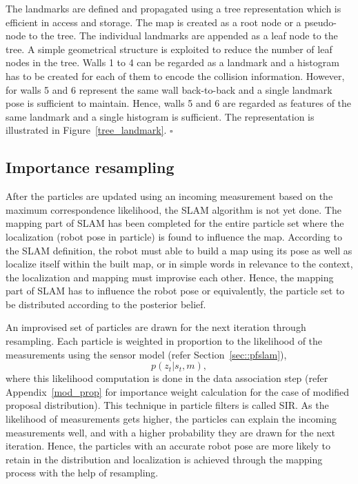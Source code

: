 The landmarks are defined and propagated using a tree representation which is efficient in access and storage. The map is created as a root node or a pseudo-node to the tree. The individual landmarks are appended as a leaf node to the tree. A simple geometrical structure is exploited to reduce the number of leaf nodes in the tree. Walls 1 to 4 can be regarded as a landmark and a histogram has to be created for each of them to encode the collision information. However, for walls 5 and 6 represent the same wall back-to-back and a single landmark pose is sufficient to maintain. Hence, walls 5 and 6 are regarded as features of the same landmark and a single histogram is sufficient. The representation is illustrated in Figure~\ref{tree_landmark}.
\hfill $\square$

\subsection{Importance resampling} \label{sec::fastslam_resample}
After the particles are updated using an incoming measurement based on the maximum correspondence likelihood, the SLAM algorithm is not yet done. The mapping part of SLAM has been completed for the entire particle set where the localization (robot pose in particle) is found to influence the map. According to the SLAM definition, the robot must able to build a map using its pose as well as localize itself within the built map, or in simple words in relevance to the context, the localization and mapping must improvise each other. Hence, the mapping part of SLAM has to influence the robot pose or equivalently, the particle set to be distributed according to the posterior belief.

An improvised set of particles are drawn for the next iteration through resampling. Each particle is weighted in proportion to the likelihood of the measurements using the sensor model (refer Section~\ref{sec::pfslam}),
\begin{equation}
p(z_t|s_t,m),
\end{equation} 
where this likelihood computation is done in the data association step (refer Appendix~\ref{mod_prop} for importance weight calculation for the case of modified proposal distribution). This technique in particle filters is called \acf{SIR}. As the likelihood of measurements gets higher, the particles can explain the incoming measurements well, and with a higher probability they are drawn for the next iteration. Hence, the particles with an accurate robot pose are more likely to retain in the distribution and localization is achieved through the mapping process with the help of resampling.

